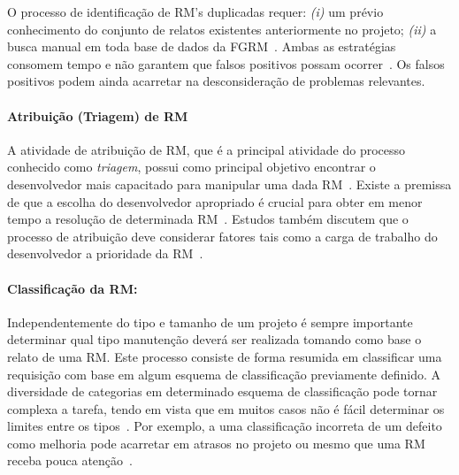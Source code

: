 O processo de identificação de RM's duplicadas requer: \textit{(i)} um prévio
conhecimento do conjunto de relatos existentes anteriormente no projeto;
\textit{(ii)} a busca manual em toda base de dados da
FGRM~\cite{banerjee2012automated,
	Lerch:2013:FDY:2495256.2495763,hindle2016contextual}. Ambas as estratégias
consomem tempo e não garantem que falsos positivos possam
ocorrer~\cite{kaushik2012comparative}. Os falsos positivos podem ainda acarretar
na desconsideração de problemas relevantes.

\paragraph{Atribuição (Triagem) de RM} A atividade de atribuição de RM, que é a
principal atividade do processo conhecido como \textit{triagem}, possui como
principal objetivo encontrar o desenvolvedor mais capacitado para manipular uma
dada RM~\cite{cavalcanti2014challenges}. Existe a premissa de que a escolha do
desenvolvedor apropriado é crucial para obter em menor tempo a re\-so\-lu\-ção
de determinada RM~\cite{di2002approach}. Estudos também discutem que o processo
de atribuição deve considerar fatores tais como a carga de trabalho do
desenvolvedor a prioridade da RM~\cite{aljarah2011selecting}.

\paragraph{Classificação da RM:} Independentemente do tipo e tamanho de um
projeto é sempre importante determinar qual tipo manutenção deverá ser realizada
tomando como base o relato de uma RM\@.  Este processo consiste de forma
resumida em classificar uma requisição com base em algum esquema de
classificação previamente definido. A diversidade de categorias em determinado
esquema de classificação pode tornar complexa a tarefa, tendo em vista que em
muitos casos não é fácil determinar os limites entre os
tipos~\cite{antoniol2008bug}. Por exemplo, a uma classificação incorreta de um
defeito como melhoria pode acarretar em atrasos no projeto ou mesmo que uma RM
receba pouca atenção~\cite{cavalcanti2014challenges}.

